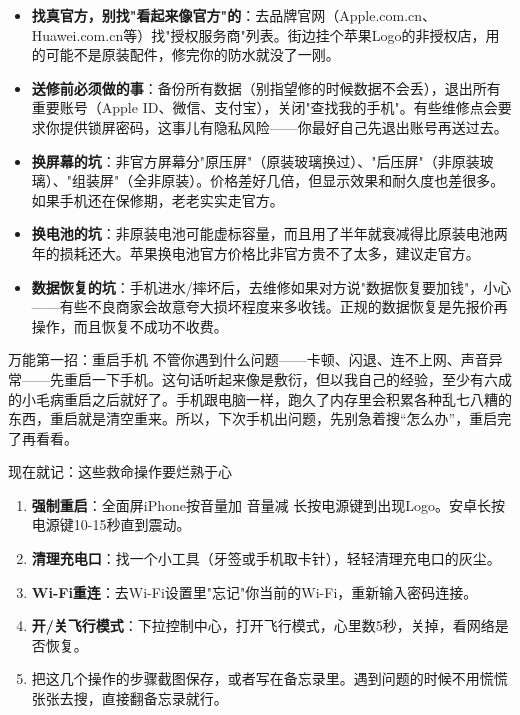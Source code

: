 \begin{itemize}
  \item \textbf{找真官方，别找"看起来像官方"的}：去品牌官网（Apple.com.cn、Huawei.com.cn等）找"授权服务商"列表。街边挂个苹果Logo的非授权店，用的可能不是原装配件，修完你的防水就没了一刚。
  \item \textbf{送修前必须做的事}：备份所有数据（别指望修的时候数据不会丢），退出所有重要账号（Apple ID、微信、支付宝），关闭"查找我的手机"。有些维修点会要求你提供锁屏密码，这事儿有隐私风险——你最好自己先退出账号再送过去。
  \item \textbf{换屏幕的坑}：非官方屏幕分"原压屏"（原装玻璃换过）、"后压屏"（非原装玻璃）、"组装屏"（全非原装）。价格差好几倍，但显示效果和耐久度也差很多。如果手机还在保修期，老老实实走官方。
  \item \textbf{换电池的坑}：非原装电池可能虚标容量，而且用了半年就衰减得比原装电池两年的损耗还大。苹果换电池官方价格比非官方贵不了太多，建议走官方。
  \item \textbf{数据恢复的坑}：手机进水/摔坏后，去维修如果对方说"数据恢复要加钱"，小心——有些不良商家会故意夸大损坏程度来多收钱。正规的数据恢复是先报价再操作，而且恢复不成功不收费。
\end{itemize}

\begin{tcbwarn}{万能第一招：重启手机}
不管你遇到什么问题——卡顿、闪退、连不上网、声音异常——先重启一下手机。这句话听起来像是敷衍，但以我自己的经验，至少有六成的小毛病重启之后就好了。手机跟电脑一样，跑久了内存里会积累各种乱七八糟的东西，重启就是清空重来。所以，下次手机出问题，先别急着搜“怎么办”，重启完了再看看。

\end{tcbwarn}

\begin{tcbpractice}{现在就记：这些救命操作要烂熟于心}
\begin{enumerate}
  \item \textbf{强制重启}：全面屏iPhone按音量加 音量减 长按电源键到出现Logo。安卓长按电源键10-15秒直到震动。
  \item \textbf{清理充电口}：找一个小工具（牙签或手机取卡针），轻轻清理充电口的灰尘。
  \item \textbf{Wi-Fi重连}：去Wi-Fi设置里"忘记"你当前的Wi-Fi，重新输入密码连接。
  \item \textbf{开/关飞行模式}：下拉控制中心，打开飞行模式，心里数5秒，关掉，看网络是否恢复。
  \item 把这几个操作的步骤截图保存，或者写在备忘录里。遇到问题的时候不用慌慌张张去搜，直接翻备忘录就行。
\end{enumerate}

\end{tcbpractice}

